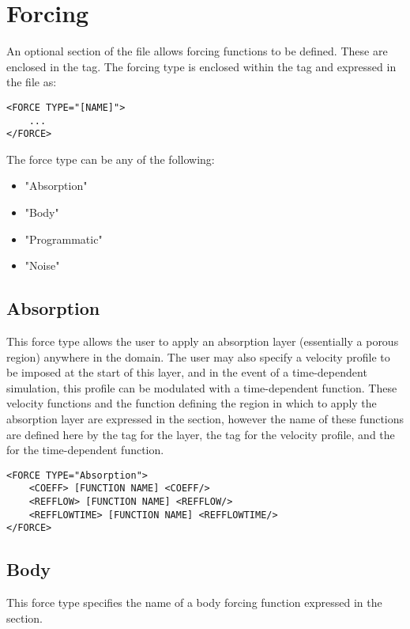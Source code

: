 \section{Forcing}
An optional section of the file allows forcing functions to be defined. These are enclosed in the
 tag. The forcing type is enclosed within the  tag and expressed in the file as:

\begin{lstlisting}[style=XMLStyle] 
<FORCE TYPE="[NAME]">
    ...
</FORCE>
\end{lstlisting}

The force type can be any of the following:
\begin{itemize}
    \item "Absorption"
    \item "Body" 
    \item "Programmatic"
    \item "Noise"
\end{itemize}

\subsection{Absorption}
This force type allows the user to apply an absorption layer (essentially a porous region) anywhere in the domain. The user may also specify a velocity profile to be imposed at the start of this layer, and in the event of a time-dependent simulation, this profile can be modulated with a time-dependent function. These velocity functions and the function defining the region in which to apply the absorption layer are expressed in the  section, however the name of these functions are defined here by the  tag for the layer, the  tag for the velocity profile, and the  for the time-dependent function.  

\begin{lstlisting}[style=XMLStyle] 
<FORCE TYPE="Absorption">
    <COEFF> [FUNCTION NAME] <COEFF/>
    <REFFLOW> [FUNCTION NAME] <REFFLOW/>
    <REFFLOWTIME> [FUNCTION NAME] <REFFLOWTIME/>
</FORCE>
\end{lstlisting}


\subsection{Body}
This force type specifies the name of a body forcing function expressed in the  section.

